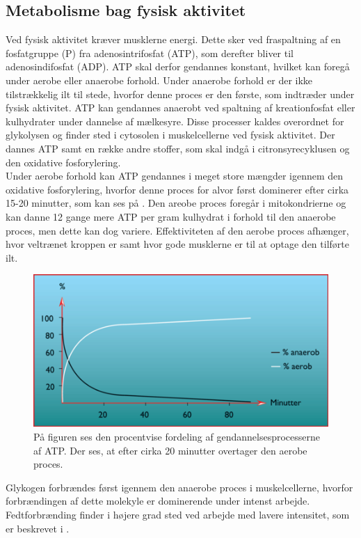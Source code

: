 \subsection{Metabolisme bag fysisk aktivitet}
Ved fysisk aktivitet kræver musklerne energi. Dette sker ved fraspaltning af en fosfatgruppe (P) fra adenosintrifosfat (ATP), som derefter bliver til adenosindifosfat (ADP). ATP skal derfor gendannes konstant, hvilket kan foregå under aerobe eller anaerobe forhold. Under anaerobe forhold er der ikke tilstrækkelig ilt til stede, hvorfor denne proces er den første, som indtræder under fysisk aktivitet. ATP kan gendannes anaerobt ved spaltning af kreationfosfat eller kulhydrater under dannelse af mælkesyre. Disse processer kaldes overordnet for glykolysen og finder sted i cytosolen i muskelcellerne ved fysisk aktivitet. Der dannes ATP samt en række andre stoffer, som skal indgå i citronsyrecyklusen og den oxidative fosforylering.\citep{Martini2012,Engelbreth2010} \\
Under aerobe forhold kan ATP gendannes i meget store mængder igennem den oxidative fosforylering, hvorfor denne proces for alvor først dominerer efter cirka 15-20 minutter, som kan ses på . Den areobe proces foregår i mitokondrierne og kan danne 12 gange mere ATP per gram kulhydrat i forhold til den anaerobe proces, men dette kan dog variere. Effektiviteten af den aerobe proces afhænger, hvor veltrænet kroppen er samt hvor gode musklerne er til at optage den tilførte ilt.\citep{Engelbreth2010,Martini2012,Stanfield2013} 
\begin{figure}[H]
	\centering
	\includegraphics[scale=0.65]{figures/aProblemanalyse/Metabolisme.png}
	\caption{På figuren ses den procentvise fordeling af gendannelsesprocesserne af ATP. Der ses, at efter cirka 20 minutter overtager den aerobe proces.\citep{Engelbreth2010}}
	\label{fig:Metabolisme}
\end{figure}
Glykogen forbrændes først igennem den anaerobe proces i muskelcellerne, hvorfor forbrændingen af dette molekyle er dominerende under intenst arbejde. Fedtforbrænding finder i højere grad sted ved arbejde med lavere intensitet, som er beskrevet i .\citep{Martini2012,Stanfield2013,Engelbreth2010}